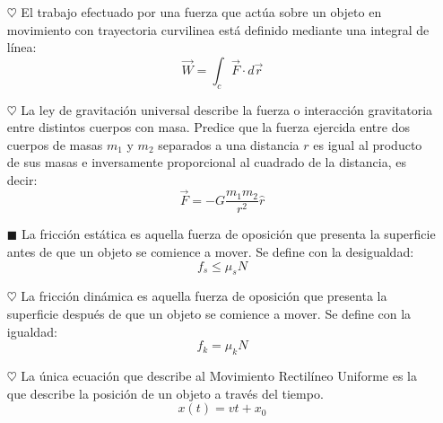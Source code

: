 \documentclass[letterpaper,12pt]{article}
\begin{document}
\begin{itemize}
    \item [$\heartsuit$] El trabajo efectuado por una fuerza que actúa sobre un objeto en movimiento con trayectoria curvilinea está definido mediante una integral de línea:
    \begin{equation*}
        \vec{W} = \int_{c} \vec{F} \cdot d\vec{r}
    \end{equation*}
    
    \item [$\heartsuit$] La ley de gravitación universal describe la fuerza o interacción gravitatoria entre distintos cuerpos con masa. Predice que la fuerza ejercida entre dos cuerpos de masas  $m_{1}$  y  $m_{2}$ separados a una distancia $r$ es igual al producto de sus masas e inversamente proporcional al cuadrado de la distancia, es decir:
    \begin{equation*}
        \vec{F} = -G \frac{m_1 m_2}{r^2} \hat{r}
    \end{equation*}
    
    \item [$\blacksquare$] La fricción estática es aquella fuerza de oposición que presenta la superficie antes de que un objeto se comience a mover. Se define con la desigualdad:
    \begin{equation*}
        f_s \leq \mu_s N
    \end{equation*}
    
    \item [$\heartsuit$] La fricción dinámica es aquella fuerza de oposición que presenta la superficie después de que un objeto se comience a mover. Se define con la igualdad:
    \begin{equation*}
        f_k = \mu_k N
    \end{equation*}
    
    \item [$\heartsuit$] La única ecuación que describe al Movimiento Rectilíneo Uniforme es la que describe la posición de un objeto a través del tiempo.
    \begin{equation*}
        x(t)= vt + x_0
    \end{equation*}
    
\end{itemize}
    
    
\end{document}
